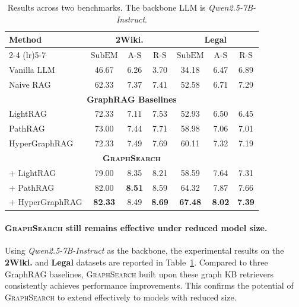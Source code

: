 \begin{table}
\vspace{-20pt}
\caption{Results across two benchmarks. The backbone LLM is \textit{Qwen2.5-7B-Instruct}.}
\label{Tab:ab_exp_7B}
\scriptsize
\setlength{\tabcolsep}{2pt}
\begin{center}
\begin{tabular}{lcccccc}
\toprule
\multirow{2}{*}{\textbf{Method}}
& \multicolumn{3}{c}{\textbf{2Wiki.}}
& \multicolumn{3}{c}{\textbf{Legal}} \\
\cmidrule[1pt](lr){2-4} \cmidrule[1pt](lr){5-7}
& {\scriptsize $\mathrm{SubEM}$} & {\scriptsize $\mathrm{A\text{-}S}$} & {\scriptsize $\mathrm{R\text{-}S}$}
& {\scriptsize $\mathrm{SubEM}$} & {\scriptsize $\mathrm{A\text{-}S}$} & {\scriptsize $\mathrm{R\text{-}S}$} \\
\midrule
Vanilla LLM      &  46.67 &  6.26 &  3.70 &  34.18 &  6.47 & 6.89  \\
Naive RAG        &  62.33 &  7.37 &  7.41 &  52.58 &  6.71 & 7.29  \\
\midrule
\multicolumn{7}{c}{\textbf{GraphRAG Baselines}} \\
\midrule
LightRAG         &  72.33 &  7.11 &  7.53 &  52.93 &  6.50 &  6.45 \\
PathRAG          &  73.00 &  7.44 &  7.71 &  58.98 &  7.06 &  7.01 \\
HyperGraphRAG    &  72.33 &  7.49 &  7.69 &  60.11 &  7.32 &  7.19 \\
\midrule
\multicolumn{7}{c}{\textbf{\textsc{GraphSearch}}  } \\
\midrule
\rowcolor{gray!20}
+ LightRAG       &  79.00 &  8.35 & 8.21 & 58.59  &  7.64 & 7.31  \\
\rowcolor{gray!20}
+ PathRAG        &  82.00 &  \textbf{8.51} &  8.59 &  64.32 & 7.87  &  7.66 \\
\rowcolor{gray!20}
+ HyperGraphRAG  &  \textbf{82.33} &  8.49 &  \textbf{8.69} &  \textbf{67.48} &  \textbf{8.02} &  \textbf{7.39} \\
\bottomrule
\end{tabular}
\end{center}
\vspace{-20pt}
\end{table}

\paragraph{\textsc{GraphSearch} still remains effective under reduced model size.} Using \textit{Qwen2.5-7B-Instruct} as the backbone, the experimental results on the \textbf{2Wiki.} and \textbf{Legal} datasets are reported in Table~\ref{Tab:ab_exp_7B}. Compared to three GraphRAG baselines, \textsc{GraphSearch} built upon these graph KB retrievers consistently achieves performance improvements. This confirms the potential of \textsc{GraphSearch} to extend effectively to models with reduced size.

